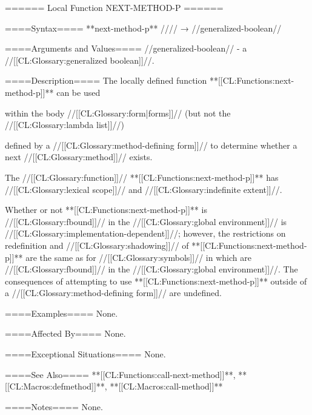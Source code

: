 ====== Local Function NEXT-METHOD-P ======

====Syntax====
**next-method-p** //\noargs// → //generalized-boolean//

====Arguments and Values====
//generalized-boolean// - a //[[CL:Glossary:generalized boolean]]//.

====Description====
The locally defined function **[[CL:Functions:next-method-p]]** can be used

within the body //[[CL:Glossary:form|forms]]// (but not the //[[CL:Glossary:lambda list]]//)

defined by a //[[CL:Glossary:method-defining form]]// to determine whether a next //[[CL:Glossary:method]]// exists.

The //[[CL:Glossary:function]]// **[[CL:Functions:next-method-p]]** has //[[CL:Glossary:lexical scope]]// and //[[CL:Glossary:indefinite extent]]//.

Whether or not **[[CL:Functions:next-method-p]]** is //[[CL:Glossary:fbound]]// in the //[[CL:Glossary:global environment]]// is //[[CL:Glossary:implementation-dependent]]//; however, the restrictions on redefinition and //[[CL:Glossary:shadowing]]// of **[[CL:Functions:next-method-p]]** are the same as for //[[CL:Glossary:symbols]]// in  which are //[[CL:Glossary:fbound]]// in the //[[CL:Glossary:global environment]]//. The consequences of attempting to use **[[CL:Functions:next-method-p]]** outside of a //[[CL:Glossary:method-defining form]]// are undefined.

====Examples====
None.

====Affected By====
None.

====Exceptional Situations====
None.

====See Also====
**[[CL:Functions:call-next-method]]**, **[[CL:Macros:defmethod]]**, **[[CL:Macros:call-method]]**

====Notes====
None.

 
